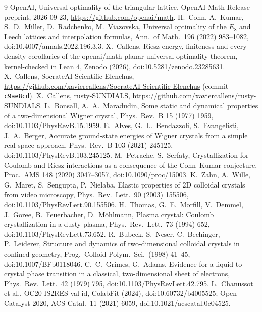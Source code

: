 \documentclass[11pt]{article}
\begin{document}
\begin{thebibliography}{9}
 OpenAI, Universal optimality of the triangular lattice, OpenAI Math Release preprint, 2026-09-23,
\url{https://github.com/openai/math}.
 H.~Cohn, A.~Kumar, S.~D.~Miller, D.~Radchenko, M.~Viazovska, Universal optimality of the $E_8$ and
Leech lattices and interpolation formulas, Ann.\ of Math.\ 196 (2022) 983--1082, doi:10.4007/annals.2022.196.3.3.
 X.~Callens, Riesz-energy, finiteness and every-density corollaries of the openai/math planar
universal-optimality theorem, kernel-checked in Lean 4, Zenodo (2026), doi:10.5281/zenodo.23285631.
 X.~Callens, SocrateAI-Scientific-Elenchus,
\url{https://github.com/xaviercallens/SocrateAI-Scientific-Elenchus} (commit \texttt{c9ae8cd}).
 X.~Callens, rusty-SUNDIALS, \url{https://github.com/xaviercallens/rusty-SUNDIALS}.
 L.~Bonsall, A.~A.~Maradudin, Some static and dynamical properties of a two-dimensional Wigner crystal,
Phys.\ Rev.\ B 15 (1977) 1959, doi:10.1103/PhysRevB.15.1959.
 E.~Alves, G.~L.~Bendazzoli, S.~Evangelisti, J.~A.~Berger, Accurate ground-state energies of Wigner
crystals from a simple real-space approach, Phys.\ Rev.\ B 103 (2021) 245125, doi:10.1103/PhysRevB.103.245125.
 M.~Petrache, S.~Serfaty, Crystallization for Coulomb and Riesz interactions as a consequence of the
Cohn--Kumar conjecture, Proc.\ AMS 148 (2020) 3047--3057, doi:10.1090/proc/15003.
 K.~Zahn, A.~Wille, G.~Maret, S.~Sengupta, P.~Nielaba, Elastic properties of 2D colloidal crystals
from video microscopy, Phys.\ Rev.\ Lett.\ 90 (2003) 155506, doi:10.1103/PhysRevLett.90.155506.
 H.~Thomas, G.~E.~Morfill, V.~Demmel, J.~Goree, B.~Feuerbacher, D.~M\"ohlmann, Plasma crystal:
Coulomb crystallization in a dusty plasma, Phys.\ Rev.\ Lett.\ 73 (1994) 652, doi:10.1103/PhysRevLett.73.652.
 R.~Bubeck, S.~Neser, C.~Bechinger, P.~Leiderer, Structure and dynamics of two-dimensional colloidal
crystals in confined geometry, Prog.\ Colloid Polym.\ Sci.\ (1998) 41--45, doi:10.1007/BFb0118046.
 C.~C.~Grimes, G.~Adams, Evidence for a liquid-to-crystal phase transition in a classical,
two-dimensional sheet of electrons, Phys.\ Rev.\ Lett.\ 42 (1979) 795, doi:10.1103/PhysRevLett.42.795.
 L.~Chanussot et al., OC20 IS2RES val id, ColabFit (2024), doi:10.60732/b4005525; Open Catalyst 2020,
ACS Catal.\ 11 (2021) 6059, doi:10.1021/acscatal.0c04525.
\end{thebibliography}
\end{document}
